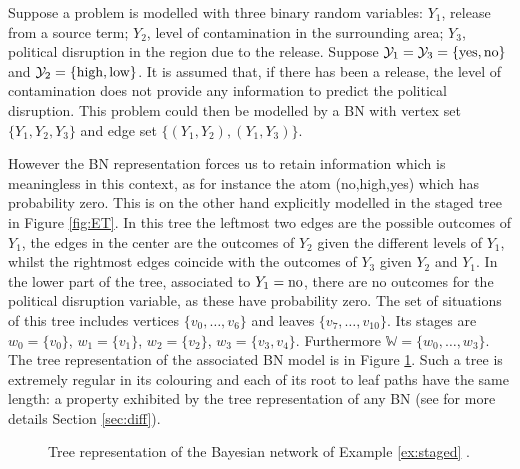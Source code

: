 \begin{example}
\label{ex:staged}
Suppose a problem is modelled with three binary random variables: $Y_1$, release from a source term; $Y_2$, level of contamination in the surrounding area; $Y_3$, political disruption in the region due to the release. Suppose $\mathcal{Y}_1=\mathcal{Y}_3=\{\textnormal{yes},\textnormal{no}\}$ and $\mathcal{Y}_2=\{\textnormal{high},\textnormal{low}\}$. It is assumed that, if there has been a release, the level of contamination does not provide any information to predict the political disruption. This problem could then be modelled by a BN with vertex set $\{Y_1,Y_2,Y_3\}$ and edge set $\{(Y_1,Y_2), (Y_1,Y_3)\}$. 

However the BN representation forces us to retain information which is meaningless in this context, as for instance the atom (no,high,yes) which has probability zero. This is on the other hand explicitly modelled in the staged tree in Figure \ref{fig:ET}. In this tree the leftmost two edges are the possible outcomes of $Y_1$, the edges in the center are the outcomes of $Y_2$ given the different levels of $Y_1$, whilst the rightmost edges coincide with the outcomes of $Y_3$ given $Y_2$ and $Y_1$. In the lower part of the tree, associated to $Y_1=\textnormal{no}$, there are no outcomes for the political disruption variable, as these have probability zero. The set of situations of this tree includes vertices $\{v_0,\dots, v_6\}$ and leaves $\{v_{7},\dots, v_{10}\}$. Its stages are $w_0=\{v_0\}$, $w_1=\{v_1\}$, $w_2=\{v_2\}$, $w_3=\{v_3,v_4\}$. Furthermore $\mathbb{W}=\{w_0,\dots,w_3\}$. The tree representation of the associated BN model is in Figure \ref{fig:ETBN}. Such a tree is extremely regular in its colouring and each of its root to leaf paths have the same length: a property exhibited by the tree representation of any BN (see for more details Section \ref{sec:diff}).
\end{example}

\begin{figure}
\centerline{
\hspace*{-16mm} }
\caption{Tree representation of the Bayesian network of Example \ref{ex:staged} .\label{fig:ETBN}}
\end{figure}

